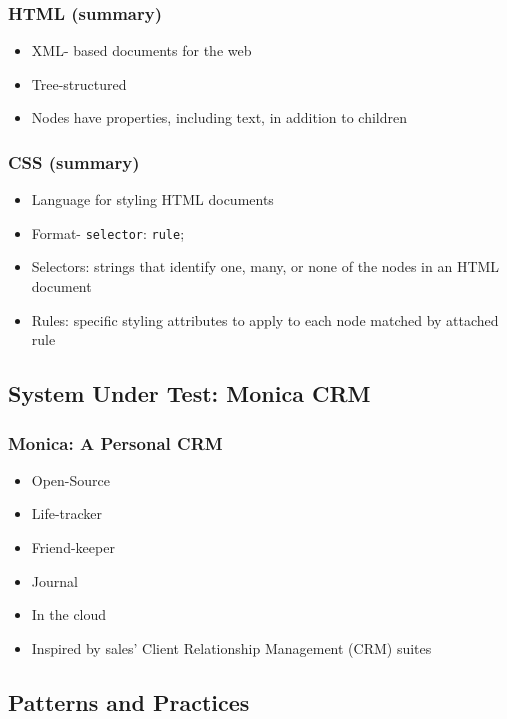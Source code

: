 \begin{frame}
  \frametitle{HTML (summary)}
  \begin{itemize}
    \item XML- based documents for the web
    \item Tree-structured
    \item Nodes have properties, including text, in addition to children
  \end{itemize}
\end{frame}

\begin{frame}
  \frametitle{CSS (summary)}
  \begin{itemize}
    \item Language for styling HTML documents
    \item Format- \texttt{selector}: \texttt{rule};
    \item Selectors: strings that identify one, many, or none of the nodes in an HTML document
    \item Rules: specific styling attributes to apply to each node matched by attached rule
  \end{itemize}
\end{frame}

\subsection{System Under Test: Monica CRM}
\begin{frame}
  \frametitle{Monica: A Personal CRM}
  \begin{itemize}
    \item Open-Source
    \item Life-tracker
    \item Friend-keeper
    \item Journal
    \item In the cloud
    \item Inspired by sales' Client Relationship Management (CRM) suites
  \end{itemize}
\end{frame}

\subsection{Patterns and Practices}

